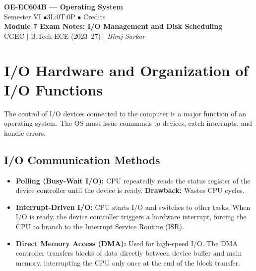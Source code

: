 \documentclass[12pt,a4paper]{article}
\begin{document}

\begin{center}
  {\LARGE\bfseries\color{myred} OE-EC604B --- Operating System}\\[5pt]
  {\normalsize\color{mydark} Semester VI \quad$\bullet$\quad 3L:0T:0P \quad$\bullet$ Credits}\\[3pt]
  {\normalsize\color{myteal}\textbf{Module 7 Exam Notes: I/O Management and Disk Scheduling}}\\[3pt]
  {\small\color{mydark} CGEC \;$|$\; B.Tech ECE (2023--27) \;$|$\; \textit{Biraj Sarkar}}
\end{center}
\vspace{2pt}
\noindent{\color{myred}\rule{\linewidth}{1.5pt}}
\vspace{2pt}

\hypersetup{linkcolor=mydark}
\tableofcontents
\hypersetup{linkcolor=myteal}
\newpage

\section{I/O Hardware and Organization of I/O Functions}

The control of I/O devices connected to the computer is a major function of an operating system. The OS must issue commands to devices, catch interrupts, and handle errors.

\subsection{I/O Communication Methods}
\begin{itemize}[leftmargin=*, itemsep=3pt]
  \item \textbf{Polling (Busy-Wait I/O):} CPU repeatedly reads the status register of the device controller until the device is ready. \textbf{Drawback:} Wastes CPU cycles.
  \item \textbf{Interrupt-Driven I/O:} CPU starts I/O and switches to other tasks. When I/O is ready, the device controller triggers a hardware interrupt, forcing the CPU to branch to the Interrupt Service Routine (ISR).
  \item \textbf{Direct Memory Access (DMA):} Used for high-speed I/O. The DMA controller transfers blocks of data directly between device buffer and main memory, interrupting the CPU only once at the end of the block transfer.
\end{itemize}
\end{document}
